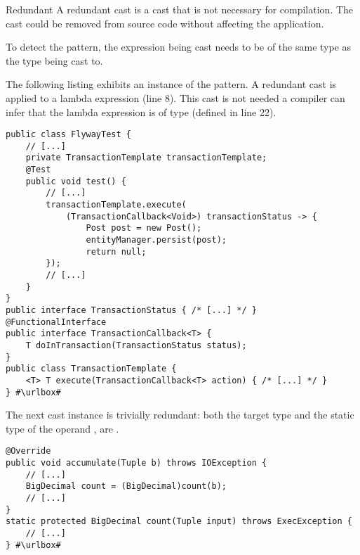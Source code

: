 \begin{pattern}{Redundant}
A redundant cast is a cast that is not necessary for compilation.
The cast could be removed from source code without affecting the application.

To detect the \thisp{} pattern, 
the expression being cast needs to be of the same type as the type being cast to.

\instances{}
The following listing exhibits an instance of the \thisp{} pattern.
A redundant cast is applied to a lambda expression (line 8).
This cast is not needed a \java{} compiler can infer that the lambda expression is of type  (defined in line 22).

\def\urlvar{http://bit.ly/vladmihalcea_high_performance_java_persistence_2FWXw2e}
\begin{verbatim}
public class FlywayTest {
    // [...]
    private TransactionTemplate transactionTemplate;
    @Test
    public void test() {
        // [...]
        transactionTemplate.execute(
            (TransactionCallback<Void>) transactionStatus -> {
                Post post = new Post();
                entityManager.persist(post);
                return null;
        });
        // [...]
    }
}
public interface TransactionStatus { /* [...] */ }
@FunctionalInterface
public interface TransactionCallback<T> {	
	T doInTransaction(TransactionStatus status);
}
public class TransactionTemplate {
	<T> T execute(TransactionCallback<T> action) { /* [...] */ }
} #\urlbox#
\end{verbatim}

The next cast instance is trivially redundant:
both the target type and the static type of the operand ,
are .

\def\urlvar{http://bit.ly/sigmoidanalytics_spork_2SIqWYq}
\begin{verbatim}
@Override
public void accumulate(Tuple b) throws IOException {
    // [...]
    BigDecimal count = (BigDecimal)count(b);
    // [...]
}
static protected BigDecimal count(Tuple input) throws ExecException {
    // [...]
} #\urlbox#
\end{verbatim}


\end{pattern}
